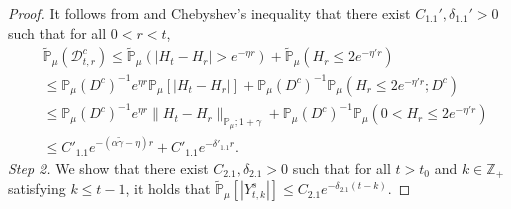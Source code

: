 \documentclass[12pt,a4paper]{amsart}
\theoremstyle{plain}
\theoremstyle{definition}
\numberwithin{equation}{section}
\begin{document}
\begin{proof}
 It follows from \cite[Proposition 2.10 \& Lemma 3.3 with $|p|=0$]{RenSongSunZhao2019Stable} and Chebyshev's inequality that there exist $C_{1.1}', \delta_{1.1}'>0$ such that for all
  $0<r<t$,
  \begin{align}
    & \mathbb{\widetilde{P}}_{\mu}(\mathcal{D}_{t,r}^c)
    \leq \mathbb{\widetilde{P}}_{\mu}(|H_t-H_{r}| > e^{-\eta r})+\mathbb{\widetilde{P}}_{\mu}(H_{r}\leq 2e^{-\eta'r}) \\
    & \leq \mathbb{P}_{\mu}(D^c)^{-1}e^{\eta r}\mathbb{P}_{\mu}[|H_t-H_r|] +  \mathbb{P}_{\mu}(D^c)^{-1} \mathbb P_\mu(H_r\leq 2e^{-\eta'r}; D^c) \\
    & \leq \mathbb{P}_{\mu}(D^c)^{-1}  e^{\eta r}\|H_t - H_r\|_{\mathbb P_\mu; 1+\gamma} + \mathbb{P}_{\mu}(D^c)^{-1} \mathbb P_\mu(0<H_r\leq 2e^{-\eta'r}) \\
    & \leq C'_{1.1} e^{-(\alpha \tilde \gamma - \eta)r}+C'_{1.1} e^{-\delta'_{1.1}r}.
  \end{align}
  \emph{Step 2.} We show that there exist $C_{2.1},\delta_{2.1} > 0$ such that for all $t>t_0$ and $k\in \mathbb Z_+$ satisfying $k\leq t-1$, it holds that $ \mathbb{\widetilde{P}}_{\mu} [|Y^s_{t,k}|] \leq  C_{2.1} e^{-\delta_{2.1} (t-k)}$.


\end{proof}
\end{document}
